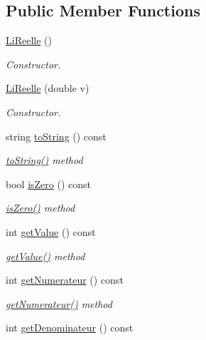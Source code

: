 \subsection*{Public Member Functions}
\begin{DoxyCompactItemize}
\item 
\hyperlink{class_li_reelle_a541e99341e86ade2967c4724becf2f1d}{Li\+Reelle} ()
\begin{DoxyCompactList}\small\item\em Constructor. \end{DoxyCompactList}\item 
\hyperlink{class_li_reelle_a45ab61569416dc569194ef80d27a07c5}{Li\+Reelle} (double v)
\begin{DoxyCompactList}\small\item\em Constructor. \end{DoxyCompactList}\item 
string \hyperlink{class_li_reelle_ad78df00afab6b86f6b0ec966f848c872}{to\+String} () const 
\begin{DoxyCompactList}\small\item\em \hyperlink{class_li_reelle_ad78df00afab6b86f6b0ec966f848c872}{to\+String()} method \end{DoxyCompactList}\item 
bool \hyperlink{class_li_reelle_a0470145a910d993012e9f6c5f8896b08}{is\+Zero} () const 
\begin{DoxyCompactList}\small\item\em \hyperlink{class_li_reelle_a0470145a910d993012e9f6c5f8896b08}{is\+Zero()} method \end{DoxyCompactList}\item 
int \hyperlink{class_li_reelle_a535bb0861646fbf417d05196e13092b0}{get\+Value} () const 
\begin{DoxyCompactList}\small\item\em \hyperlink{class_li_reelle_a535bb0861646fbf417d05196e13092b0}{get\+Value()} method \end{DoxyCompactList}\item 
int \hyperlink{class_li_reelle_aced0465644e6ce7c67dca27ef32d1f80}{get\+Numerateur} () const 
\begin{DoxyCompactList}\small\item\em \hyperlink{class_li_reelle_aced0465644e6ce7c67dca27ef32d1f80}{get\+Numerateur()} method \end{DoxyCompactList}\item 
int \hyperlink{class_li_reelle_a50d6d5764a8cff1ad1676db99c6f2115}{get\+Denominateur} () const 

\end{DoxyCompactItemize}
